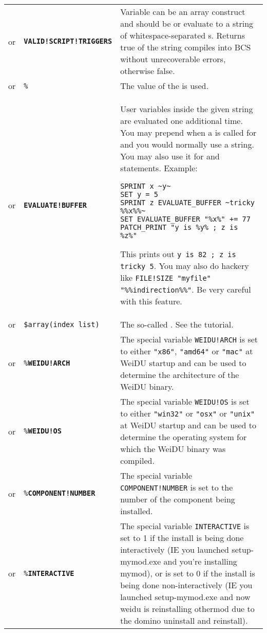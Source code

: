 \documentclass{article}
\def\ttref#1{\ahrefloc{#1}{\tt #1}}
\def\DEFINE#1{{\tt \bf #1}\label{#1}\index{#1}}
\def\DEFSYN#1{{\tt \bf #1}\index{#1}}
\def\t#1{{\tt #1}}
\begin{document}
\begin{tabular}{cp{10in}|p{10in}}
or & \DEFINE{VALID!SCRIPT!TRIGGERS} \ttref{variable} &

Variable can be an array construct and should be or evaluate to a
string of whitespace-separated \ttref{Infinity Engine trigger}s.
Returns true of the string compiles into BCS without
unrecoverable errors, otherwise false.\\

or & \t{\%}\ttref{variable}\t{\%}   &
    The value of the \ttref{variable} is used. \\

or & \DEFSYN{EVALUATE!BUFFER} \ttref{variable} &
    User variables inside the given string are evaluated one additional
    time. You may prepend \ttref{EVALUATE!BUFFER} when a \ttref{value} is
    called for and you would normally use a string. You may also use it for
\ttref{SET} and \ttref{SPRINT} statements. Example:
\begin{verbatim}
SPRINT x ~y~
SET y = 5
SPRINT z EVALUATE_BUFFER ~tricky %%x%%~
SET EVALUATE_BUFFER "%x%" += 77
PATCH_PRINT "y is %y% ; z is %z%"
\end{verbatim}
    This prints out \t{y is 82 ; z is tricky 5}. You may also do hackery like
    \t{FILE!SIZE "myfile" "\%\%indirection\%\%"}. Be very careful with this
    feature. \\
or & \verb+$array(index list)+ &
    The so-called \ttref{array construct}. See the tutorial.
\\

or & \t{\%}\DEFINE{WEIDU!ARCH}\t{\%} & The special variable \t{WEIDU!ARCH}
is set to either \t{"x86"}, \t{"amd64"} or \t{"mac"} at WeiDU startup and can be used to
determine the architecture of the WeiDU binary. \\

or & \t{\%}\DEFINE{WEIDU!OS}\t{\%} & The special variable \t{WEIDU!OS} is set to either
\t{"win32"} or \t{"osx"} or \t{"unix"} at WeiDU startup and can be used to
determine the operating system for which the WeiDU binary was compiled. \\

or & \t{\%}\DEFINE{COMPONENT!NUMBER}\t{\%} & The special variable \t{COMPONENT!NUMBER}
is set to the number of the component being installed. \\

or & \t{\%}\DEFINE{INTERACTIVE}\t{\%} & The special variable \t{INTERACTIVE}
is set to 1 if the install is being done interactively (IE you launched setup-mymod.exe and you're
installing mymod), or is set to 0 if the install is being done non-interactively (IE you launched
setup-mymod.exe and now weidu is reinstalling othermod due to the domino uninstall and reinstall). \\


\end{tabular}
\end{document}
